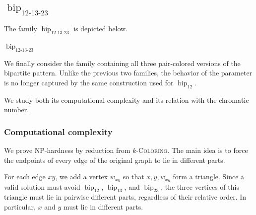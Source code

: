 \documentclass[12pt]{article}
\theoremstyle{plain}
\theoremstyle{definition}
\theoremstyle{remark}
\theoremstyle{definition}
\newcommand{\biplabel}{\mathrm{bip}}
\DeclareRobustCommand{\bipparam}[1]{%
  \ensuremath{\mathop{\biplabel}\nolimits_{#1}}%
}
\begin{document}
\subsection{
\texorpdfstring{\(\bipparam{12\text{-}13\text{-}23}\)}
{bip12-13-23}
}
\label{subsec:bip12-13-23}



The family \(\bipparam{12\text{-}13\text{-}23}\) is depicted below.

\medskip
\begin{center}

\smallskip
\(\bipparam{12\text{-}13\text{-}23}\)
\end{center}


We finally consider the family containing all three pair-colored versions
of the bipartite pattern. Unlike the previous two families, the behavior of
the parameter is no longer captured by the same construction used for
\(\bipparam{12}\).

We study both its computational complexity and its relation with the
chromatic number.


\subsubsection{Computational complexity}




We prove NP-hardness by reduction from \(k\)-\textsc{Coloring}. The main
idea is to force the endpoints of every edge of the original graph to lie
in different parts.

For each edge \(xy\), we add a vertex \(w_{xy}\) so that
\(x,y,w_{xy}\) form a triangle. Since a valid solution must avoid
\(\bipparam{12}\), \(\bipparam{13}\), and \(\bipparam{23}\), the three
vertices of this triangle must lie in pairwise different parts, regardless
of their relative order. In particular, \(x\) and \(y\) must lie in
different parts.
\end{document}
